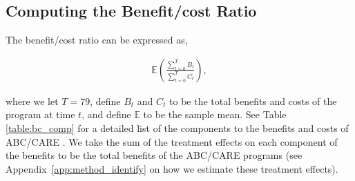 

\subsection{Computing the Benefit/cost Ratio}
\label{app:method_cbratio}

\noindent The benefit/cost ratio can be expressed as,

\begin{align}
\mathbb{E} \left( \frac{ \sum_{t=0}^T B_t}{\sum_{t=0}^T C_t} \right),
\end{align}

\noindent where we let $T = 79$, define $B_t$ and $C_t$ to be the total benefits and costs of the
program at time $t$, and define $\mathbb{E}$ to be the sample mean. See Table \ref{table:bc_comp} for a detailed list of the components
to the benefits and costs of ABC/CARE . We take the sum of the treatment effects on each component
of the benefits to be the total benefits of the ABC/CARE programs (see Appendix~\ref{app:method_identify} on how we estimate these treatment effects). \\

